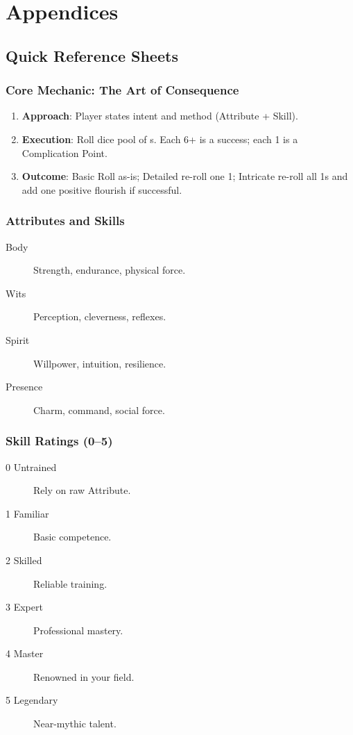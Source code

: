 \chapter{Appendices}

\section{Quick Reference Sheets}

\subsection{Core Mechanic: The Art of Consequence}

\begin{enumerate}
\item \textbf{Approach}: Player states intent and method (Attribute + Skill).
\item \textbf{Execution}: Roll dice pool of s. Each 6+ is a success; each 1 is a Complication Point.
\item \textbf{Outcome}: Basic Roll as-is; Detailed re-roll one 1; Intricate re-roll all 1s and add one positive flourish if successful.
\end{enumerate}

\subsection{Attributes and Skills}

\begin{description}
\item[Body] Strength, endurance, physical force.
\item[Wits] Perception, cleverness, reflexes.
\item[Spirit] Willpower, intuition, resilience.
\item[Presence] Charm, command, social force.
\end{description}

\subsection{Skill Ratings (0--5)}

\begin{description}
\item[0 Untrained] Rely on raw Attribute.
\item[1 Familiar] Basic competence.
\item[2 Skilled] Reliable training.
\item[3 Expert] Professional mastery.
\item[4 Master] Renowned in your field.
\item[5 Legendary] Near-mythic talent.
\end{description}

